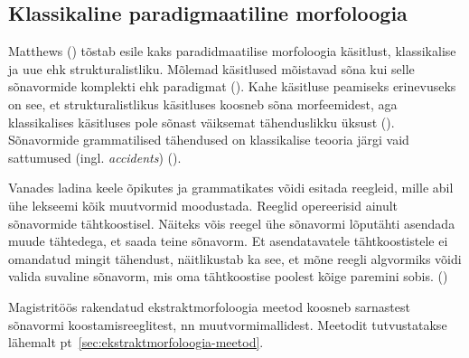 \documentclass[12pt,a4paper]{article}
\begin{document}
\subsection{Klassikaline paradigmaatiline morfoloogia}
\label{klassikaline-paradigmaatiline}


Matthews (\citeyear[186]{matthews_morphology_1991}) tõstab esile kaks paradidmaatilise morfoloogia käsitlust, klassikalise ja uue ehk strukturalistliku.
Mõlemad käsitlused mõistavad sõna kui selle sõnavormide komplekti ehk paradigmat (\citeyear[186]{matthews_morphology_1991}). 
Kahe käsitluse peamiseks erinevuseks on see, et strukturalistlikus käsitluses koosneb sõna morfeemidest, aga klassikalises käsitluses pole sõnast väiksemat tähenduslikku üksust (\citeyear[196]{matthews_morphology_1991}). Sõnavormide grammatilised tähendused on klassikalise teooria järgi vaid sattumused (ingl. \textit{accidents}) (\citeyear[189]{matthews_morphology_1991}). %


Vanades ladina keele õpikutes ja grammatikates võidi esitada reegleid, mille abil ühe lekseemi kõik muutvormid moodustada. Reeglid opereerisid ainult sõnavormide tähtkoostisel. Näiteks võis reegel ühe sõnavormi lõputähti asendada muude tähtedega, et saada teine sõnavorm. Et asendatavatele tähtkoostistele ei omandatud mingit tähendust, näitlikustab ka see, et mõne reegli algvormiks võidi valida suvaline sõnavorm, mis oma tähtkoostise poolest kõige paremini sobis. (\cite[195-196]{matthews_morphology_1991})


Magistritöös rakendatud ekstrakt\-morfoloogia meetod koosneb sarnastest sõna\-vormi koostamis\-reeglitest, nn muutvormi\-mallidest. Meetodit tutvustatakse lähemalt pt~\ref{sec:ekstraktmorfoloogia-meetod}.

\end{document}
